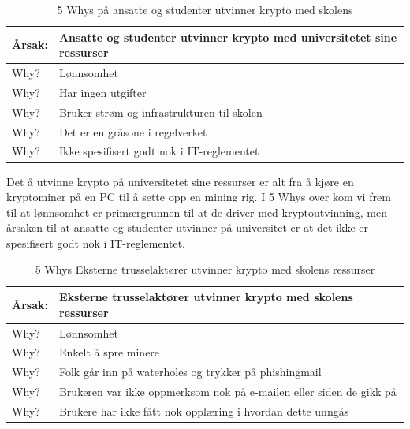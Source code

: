 \begin{table} [H]
    \centering
    \begin{tabular}{ | m{5em} | m{30em} | }
        \hline
            \cellcolor{yellow} Årsak: & \cellcolor{yellow} Ansatte og studenter utvinner krypto med universitetet sine ressurser                \\
        \hline
            Why? & Lønnsomhet                                    \\
        \hline
            Why? & Har ingen utgifter                                            \\
        \hline
            Why? & Bruker strøm og infrastrukturen til skolen                \\
        \hline
            Why? & Det er en gråsone i regelverket           \\
        \hline
            Why? & Ikke spesifisert godt nok i IT-reglementet   \\
        \hline
    \end{tabular}
    \caption[5 Whys: Ansatte og studenter utvinner krypto med skolens]{5 Whys på ansatte og studenter utvinner krypto med skolens}
    \label{5Whys-interne}
\end{table}
Det å utvinne krypto på universitetet sine ressurser er alt fra å kjøre en kryptominer på en PC til å sette opp en mining rig. I 5 Whys over kom vi frem til at lønnsomhet er primærgrunnen til at de driver med kryptoutvinning, men årsaken til at ansatte og studenter utvinner på universitet er at det ikke er spesifisert godt nok i IT-reglementet.   


\begin{table} [H]
    \centering
    \begin{tabular}{ | m{5em} | m{30em} | }
        \hline
            \cellcolor{yellow} Årsak: & \cellcolor{yellow} Eksterne trusselaktører utvinner krypto med skolens ressurser              \\
        \hline
            Why? & Lønnsomhet                                   \\
        \hline
            Why? & Enkelt å spre minere                                           \\
        \hline
            Why? & Folk går inn på waterholes og trykker på phishingmail               \\
        \hline
            Why? & Brukeren var ikke oppmerksom nok på e-mailen eller siden de gikk på           \\
        \hline
            Why? & Brukere har ikke fått nok opplæring i hvordan dette unngås    \\
        \hline
    \end{tabular}
    \caption[5 Whys: Eksterne trusselaktører utvinner krypto med skolens ressurser]{5 Whys Eksterne trusselaktører utvinner krypto med skolens ressurser}
    \label{5Whys-eksterne}
\end{table}

